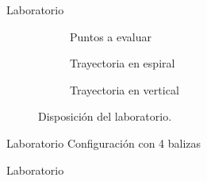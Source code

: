 \documentclass{beamer}
\begin{document}
  \begin{frame}{Laboratorio}
    \begin{figure}[H]
      \begin{subfigure}[b]{.3\textwidth}
        \centering
        \def\svgwidth{0.85\linewidth}
         
        \caption{Puntos a evaluar}
        \label{fig:puntos}
      \end{subfigure}
      \begin{subfigure}[b]{.3\textwidth}
        \centering
        \def\svgwidth{0.85\linewidth}
         
        \caption{Trayectoria en espiral}
        \label{fig:espiral}
      \end{subfigure}
      \begin{subfigure}[b]{.3\textwidth}
          \centering
          \def\svgwidth{0.85\linewidth}
         
          \caption{Trayectoria en vertical}
          \label{fig:vertical}
        \end{subfigure}
      \caption{Disposición del laboratorio.}
      \label{fig:laboratorio}
      \end{figure}
  \end{frame}

  \begin{frame}{Laboratorio}
    Configuración con 4 balizas
    \begin{figure}[H]
      \centering
      \def\svgwidth{0.4\linewidth}
       
      \label{fig:lab_4sens}
    \end{figure}
  \end{frame}

  \begin{frame}{Laboratorio}
    \begin{figure}[H]
      \centering
      \scalebox{0.6}{}
      \label{fig:res_4_lab}
  \end{figure}
  \end{frame}
  
\end{document}
